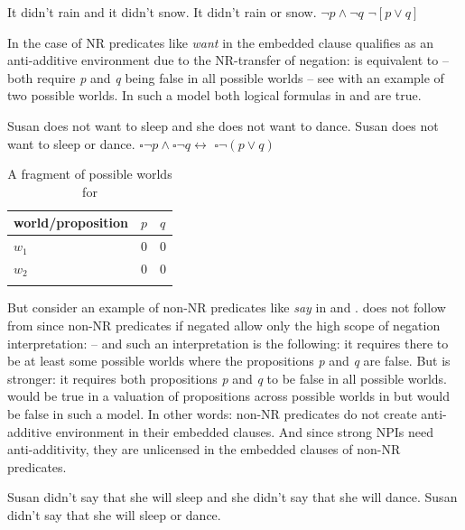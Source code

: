 \documentclass[output=paper,
]{langscibook}
\begin{document}
\ea \ea\label{ex-29-a} It didn't rain and it didn't snow.
\ex \label{ex-29-b} It didn't rain or snow.
\ex \label{ex-29-c} $\neg p \wedge \neg q$
\ex \label{ex-29-d} $\neg[p \vee q]$
\z
\z

\noindent In the case of NR predicates like \textit{want} in  the embedded clause qualifies as an anti-additive environment due to the NR-transfer of negation:  is equivalent to  -- both require \textit{p} and \textit{q} being false in all possible worlds -- see  with an example of two possible worlds. In such a model both logical formulas in  and  are true.

\ea \label{ex-30}\ea \label{ex-30-a} Susan does not want to sleep and she does not want to dance.
\ex \label{ex-30-b} Susan does not want to sleep or dance.
\ex \label{ex-30-c} $\square \neg p \wedge \square \neg q \leftrightarrow$
\ex \label{ex-30-d} $\square \neg(p \vee q)$
\z
\z

\begin{table}
\begin{tabularx}{0.4\textwidth}{lXX}
\lsptoprule
world/proposition & $p$ & $q$\tabularnewline
\midrule
$w_1$ & 0 & 0\tabularnewline
$w_2$ & 0 & 0\tabularnewline
\lspbottomrule
\end{tabularx}
\caption{A fragment of possible worlds for }
     \label{tab:table4_w1_w2}
\end{table}


\noindent But consider an example of non-NR predicates like \textit{say} in  and .  does not follow from   since non-NR predicates if negated allow only the high scope of negation interpretation:  -- and such an interpretation is the following: it requires there to be at least some possible worlds where the propositions \textit{p} and \textit{q} are false. But  is stronger: it requires both propositions \textit{p} and \textit{q} to be false in all possible worlds.  would be true in a valuation of propositions across possible worlds in  but  would be false in such a model. In other words: non-NR predicates do not create anti-additive environment in their embedded clauses. And since strong NPIs need anti-additivity, they are unlicensed in the embedded clauses of non-NR predicates.

\ea \ea\label{ex-31-a} Susan didn't say that she will sleep and she didn't say that she will dance.
\ex \label{ex-31-b} Susan didn't say that she will sleep or dance.
\z
\z
\end{document}
